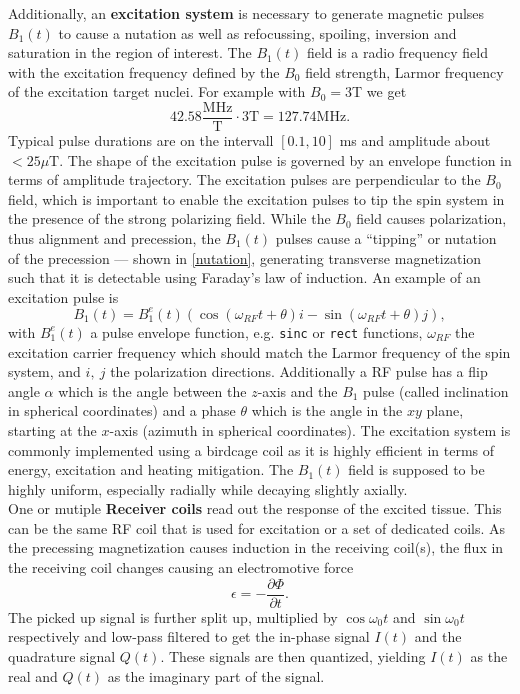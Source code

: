 Additionally, an \textbf{excitation system} is necessary to generate magnetic pulses $B_1(t)$ to cause a nutation as well as refocussing, spoiling, inversion and saturation in the region of interest.
The $B_1(t)$ field is a radio frequency field with the excitation frequency defined by the $B_0$ field strength, Larmor frequency of the excitation target nuclei.
For example with $B_0 = 3$T we get
\[ 42.58 \frac{\text{MHz}}{\text{T}} \cdot 3 \text{T} = 127.74 \text{MHz}. \]
Typical pulse durations are on the intervall $[0.1, 10]$ ms and amplitude about $< 25 \mu \text{T}$.
The shape of the excitation pulse is governed by an envelope function in terms of amplitude trajectory.
The excitation pulses are perpendicular to the $B_0$ field, which is important to enable the excitation pulses to tip the spin system in the presence of the strong polarizing field.
While the $B_0$ field causes polarization, thus alignment and precession, the $B_1(t)$ pulses cause a ``tipping'' or nutation of the precession --- shown in \ref{nutation}, generating transverse magnetization such that it is detectable using Faraday's law of induction.
An example of an excitation pulse is
\[ B_1(t) = B_1^e (t) \left(\cos\left(\omega_{RF} t + \theta \right) i - \sin\left(\omega_{RF} t + \theta \right) j \right), \]
with $B_1^e (t)$ a pulse envelope function, e.g. \texttt{sinc} or \texttt{rect} functions, $\omega_{RF}$ the excitation carrier frequency which should match the Larmor frequency of the spin system, and $i, \ j$ the polarization directions.
Additionally a RF pulse has a flip angle $\alpha$ which is the angle between the $z$-axis and the $B_1$ pulse (called inclination in spherical coordinates) and a phase $\theta$ which is the angle in the $xy$ plane, starting at the $x$-axis (azimuth in spherical coordinates).
The excitation system is commonly implemented using a birdcage coil as it is highly efficient in terms of energy, excitation and  heating mitigation.
The $B_1(t)$ field is supposed to be highly uniform, especially radially while decaying slightly axially. \\

One or mutiple \textbf{Receiver coils} read out the response of the excited tissue.
This can be the same RF coil that is used for excitation or a set of dedicated coils.
As the precessing magnetization causes induction in the receiving coil(s), the flux in the receiving coil changes causing an electromotive force
\[ \epsilon = - \frac{\partial \Phi}{\partial t}. \]
The picked up signal is further split up, multiplied by $\cos{\omega_0 t}$ and $\sin{\omega_0 t}$ respectively and low-pass filtered to get the in-phase signal $I(t)$ and the quadrature signal $Q(t)$.
These signals are then quantized, yielding $I(t)$ as the real and $Q(t)$ as the imaginary part of the signal.

